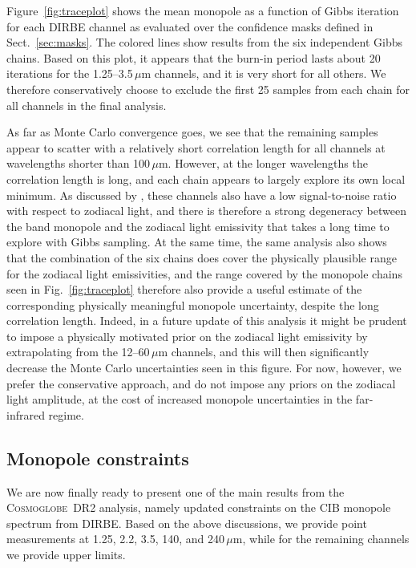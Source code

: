 \documentclass{aa}
\newcommand{\cosmoglobe}{\textsc{Cosmoglobe}}
\begin{document}
Figure~\ref{fig:traceplot} shows the mean monopole as a function of
Gibbs iteration for each DIRBE channel as evaluated over the
confidence masks defined in Sect.~\ref{sec:masks}. The colored lines
show results from the six independent Gibbs chains. Based on this
plot, it appears that the burn-in period lasts about 20\,iterations
for the 1.25--3.5$\,\mu\mathrm{m}$ channels, and it is very short for
all others. We therefore conservatively choose to exclude the first 25
samples from each chain for all channels in the final analysis.

As far as Monte Carlo convergence goes, we see that the remaining
samples appear to scatter with a relatively short correlation length
for all channels at wavelengths shorter than
100$\,\mu\mathrm{m}$. However, at the longer wavelengths the
correlation length is long, and each chain appears to largely explore
its own local minimum. As discussed by \citet{CG02_02}, these channels
also have a low signal-to-noise ratio with respect to zodiacal light,
and there is therefore a strong degeneracy between the band monopole
and the zodiacal light emissivity that takes a long time to explore
with Gibbs sampling. At the same time, the same analysis also shows
that the combination of the six chains does cover the physically
plausible range for the zodiacal light emissivities, and the range
covered by the monopole chains seen in Fig.~\ref{fig:traceplot}
therefore also provide a useful estimate of the corresponding
physically meaningful monopole uncertainty, despite the long
correlation length. Indeed, in a future update of this analysis it
might be prudent to impose a physically motivated prior on the
zodiacal light emissivity by extrapolating from the
12--60\,$\mu\mathrm{m}$ channels, and this will then significantly
decrease the Monte Carlo uncertainties seen in this figure. For now,
however, we prefer the conservative approach, and do not impose any
priors on the zodiacal light amplitude, at the cost of increased
monopole uncertainties in the far-infrared regime.

\subsection{Monopole constraints}

We are now finally ready to present one of the main results from the
\cosmoglobe\ DR2 analysis, namely updated constraints on the CIB
monopole spectrum from DIRBE. Based on the above discussions, we
provide point measurements at 1.25, 2.2, 3.5, 140, and
240$\,\mu\mathrm{m}$, while for the remaining channels we provide
upper limits.
\end{document}
